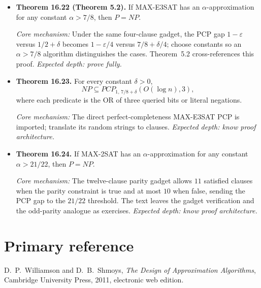 \documentclass[11pt,a4paper]{article}
\newcommand{\1}{\mathbf 1}
\newcommand{\catalogue}[4]{%
  \item \textbf{#1.} #2\par
  {\footnotesize\emph{Core mechanism:} #3
  \emph{Expected depth: #4.}}}
\begin{document}
\begin{itemize}
\catalogue{Theorem 16.22 (Theorem 5.2)}{If MAX-E3SAT has an
$\alpha$-approximation for any constant $\alpha>7/8$, then $P=NP$.}
{Under the same four-clause gadget, the PCP gap
$1-\varepsilon$ versus $1/2+\delta$ becomes
$1-\varepsilon/4$ versus $7/8+\delta/4$; choose constants so an
$\alpha>7/8$ algorithm distinguishes the cases. Theorem~5.2 cross-references
this proof.}{prove fully}

\catalogue{Theorem 16.23}{For every constant $\delta>0$,
\[
NP\subseteq PCP_{1,\,7/8+\delta}(O(\log n),3),
\]
where each predicate is the OR of three queried bits or literal negations.}
{The direct perfect-completeness MAX-E3SAT PCP is imported; translate its
random strings to clauses.}{know proof architecture}

\catalogue{Theorem 16.24}{If MAX-2SAT has an $\alpha$-approximation for any
constant $\alpha>21/22$, then $P=NP$.}{The twelve-clause parity gadget allows
$11$ satisfied clauses when the parity constraint is true and at most $10$
when false, sending the PCP gap to the $21/22$ threshold. The text leaves the
gadget verification and the odd-parity analogue as exercises.}
{know proof architecture}
\end{itemize}

\endgroup
\section{Primary reference}
D.~P.~Williamson and D.~B.~Shmoys,
\emph{The Design of Approximation Algorithms}, Cambridge University Press, 2011,
electronic web edition.
\end{document}
